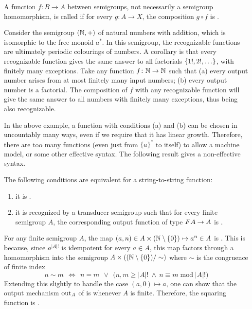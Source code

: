 \AP A function $f\colon B \to A$ between semigroups, not necessarily a semigroup
homomorphism, is called  if for every
 $g\colon A \to X$, the composition $g \circ f$ is
.

\begin{example}
  Consider the semigroup $({\mathbb N}, +)$ of natural numbers with addition, which is isomorphic to the free monoid $a^*$. In this semigroup, the recognizable functions are ultimately periodic colourings of numbers. A corollary is that every recognizable function gives the same answer to all factorials $\{1!,2!,\ldots\}$, with finitely many exceptions. Take any function $f\colon {\mathbb N} \to {\mathbb N}$ such that (a) every output number arises from at most finitely many input numbers; (b) every output number is a factorial. The composition of $f$ with any recognizable function will give the same answer to all numbers with finitely many exceptions, thus being also recognizable.
\end{example}

In the above example, a function with conditions (a) and (b) can be chosen in uncountably many ways, even if we require that it has linear growth.
Therefore, there are too many  functions (even
just from $\{a\}^*$ to itself) to
allow a machine model, or some other effective syntax. The following result
gives a non-effective syntax.

\begin{theorem}\label{thm:reco-reflecting-functions} The following conditions are equivalent for a string-to-string function:
 \begin{enumerate}
 \item \label{it:reco-refl} it is .
 \item \label{it:trans-semig-reco}it is recognized by a transducer semigroup such that for every finite semigroup $A$, the corresponding output function of type 
 $\functor A \to A$
 is .
 \end{enumerate}
\end{theorem}
\begin{example}\label{ex:squaring-reco-refl}
  For any finite semigroup $A$, the map $(a,n) \in A \times
  ({\mathbb N}\setminus\{0\}) \mapsto a^n \in A$ is . This is
  because, since $a^{|A|!}$ is idempotent for every $a\in A$, this map factors
  through a homomorphism into the semigroup $A \times
  (({\mathbb N}\setminus\{0\})/\sim)$ where $\sim$ is the congruence of
  finite index
  \[ n \sim m ~~\iff~~ n = m ~~\lor~~ \big(n,m \geq |A|! ~\land~ n \equiv m \;\mathrm{mod}\; |A|!\big) \]
  Extending this slightly to handle the case $(a,0)\mapsto a$, one can show that the output mechanism $\mathrm{out}_A$ of  is  whenever $A$ is finite. Therefore, the squaring function is .
\end{example}
